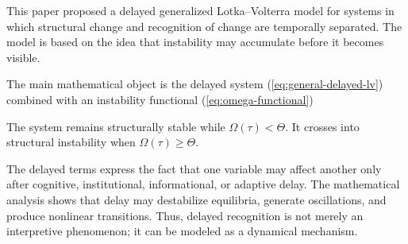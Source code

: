 \documentclass[11pt]{article}
\def\eq#1{(\ref{#1})}
\begin{document}
This paper proposed a delayed generalized Lotka--Volterra model for systems in which structural change and recognition of change are temporally separated. The model is based on the idea that instability may accumulate before it becomes visible.

The main mathematical object is the delayed system \eq{eq:general-delayed-lv}
combined with an instability functional \eq{eq:omega-functional}

The system remains structurally stable while
$
\Omega(\tau)<\Theta.
$
It crosses into structural instability when
$
\Omega(\tau)\geq\Theta.
$

The delayed terms express the fact that one variable may affect another only after cognitive, institutional, informational, or adaptive delay. The mathematical analysis shows that delay may destabilize equilibria, generate oscillations, and produce nonlinear transitions. Thus, delayed recognition is not merely an interpretive phenomenon; it can be modeled as a dynamical mechanism.




%
\end{document}
